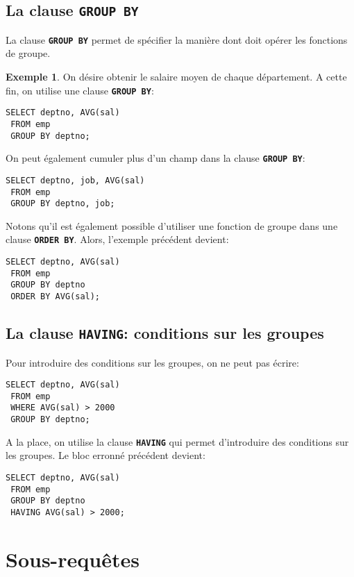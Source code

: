 \documentclass[a4paper, 12pt]{report}
\newcommand{\textSQL}[1]{\texttt{\textbf{#1}}}
\theoremstyle{definition} \newtheorem{ex}{Exemple}
\begin{document}
\section{La clause \textSQL{GROUP BY}}

La clause \textSQL{GROUP BY} permet de spécifier la manière dont doit opérer les fonctions de groupe.
\begin{ex}
On désire obtenir le salaire moyen de chaque département. A cette fin, on utilise une clause \textSQL{GROUP BY}:
\begin{lstlisting}[frame=single]
SELECT deptno, AVG(sal)
 FROM emp
 GROUP BY deptno;
\end{lstlisting}

On peut également cumuler plus d'un champ dans la clause \textSQL{GROUP BY}:
\begin{lstlisting}[frame=single]
SELECT deptno, job, AVG(sal)
 FROM emp
 GROUP BY deptno, job;
\end{lstlisting}

Notons qu'il est également possible d'utiliser une fonction de groupe dans une clause \textSQL{ORDER BY}. Alors, l'exemple précédent devient:
\begin{lstlisting}[frame=single]
SELECT deptno, AVG(sal)
 FROM emp
 GROUP BY deptno
 ORDER BY AVG(sal);
\end{lstlisting}
\end{ex} 

\section[La clause \textSQL{HAVING}]{La clause \textSQL{HAVING}: conditions sur les groupes}
Pour introduire des conditions sur les groupes, on ne peut pas écrire:
\begin{lstlisting}[frame=single]
SELECT deptno, AVG(sal)
 FROM emp
 WHERE AVG(sal) > 2000
 GROUP BY deptno;
\end{lstlisting}

A la place, on utilise la clause \textSQL{HAVING} qui permet d'introduire des conditions sur les groupes. Le bloc erronné précédent devient:
\begin{lstlisting}[frame=single]
SELECT deptno, AVG(sal)
 FROM emp
 GROUP BY deptno
 HAVING AVG(sal) > 2000;
\end{lstlisting}

\chapter{Sous-requêtes}
\end{document}
